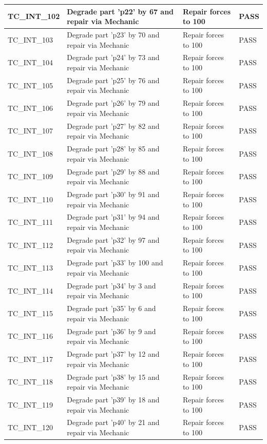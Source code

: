 \documentclass{article}
\begin{document}
\begin{longtable}{|p{2cm}|p{8cm}|p{3cm}|p{2cm}|}
\hline
TC\_INT\_102 & Degrade part 'p22' by 67 and repair via Mechanic & Repair forces to 100 & PASS \\
\hline
TC\_INT\_103 & Degrade part 'p23' by 70 and repair via Mechanic & Repair forces to 100 & PASS \\
\hline
TC\_INT\_104 & Degrade part 'p24' by 73 and repair via Mechanic & Repair forces to 100 & PASS \\
\hline
TC\_INT\_105 & Degrade part 'p25' by 76 and repair via Mechanic & Repair forces to 100 & PASS \\
\hline
TC\_INT\_106 & Degrade part 'p26' by 79 and repair via Mechanic & Repair forces to 100 & PASS \\
\hline
TC\_INT\_107 & Degrade part 'p27' by 82 and repair via Mechanic & Repair forces to 100 & PASS \\
\hline
TC\_INT\_108 & Degrade part 'p28' by 85 and repair via Mechanic & Repair forces to 100 & PASS \\
\hline
TC\_INT\_109 & Degrade part 'p29' by 88 and repair via Mechanic & Repair forces to 100 & PASS \\
\hline
TC\_INT\_110 & Degrade part 'p30' by 91 and repair via Mechanic & Repair forces to 100 & PASS \\
\hline
TC\_INT\_111 & Degrade part 'p31' by 94 and repair via Mechanic & Repair forces to 100 & PASS \\
\hline
TC\_INT\_112 & Degrade part 'p32' by 97 and repair via Mechanic & Repair forces to 100 & PASS \\
\hline
TC\_INT\_113 & Degrade part 'p33' by 100 and repair via Mechanic & Repair forces to 100 & PASS \\
\hline
TC\_INT\_114 & Degrade part 'p34' by 3 and repair via Mechanic & Repair forces to 100 & PASS \\
\hline
TC\_INT\_115 & Degrade part 'p35' by 6 and repair via Mechanic & Repair forces to 100 & PASS \\
\hline
TC\_INT\_116 & Degrade part 'p36' by 9 and repair via Mechanic & Repair forces to 100 & PASS \\
\hline
TC\_INT\_117 & Degrade part 'p37' by 12 and repair via Mechanic & Repair forces to 100 & PASS \\
\hline
TC\_INT\_118 & Degrade part 'p38' by 15 and repair via Mechanic & Repair forces to 100 & PASS \\
\hline
TC\_INT\_119 & Degrade part 'p39' by 18 and repair via Mechanic & Repair forces to 100 & PASS \\
\hline
TC\_INT\_120 & Degrade part 'p40' by 21 and repair via Mechanic & Repair forces to 100 & PASS \\

\end{longtable}
\end{document}
